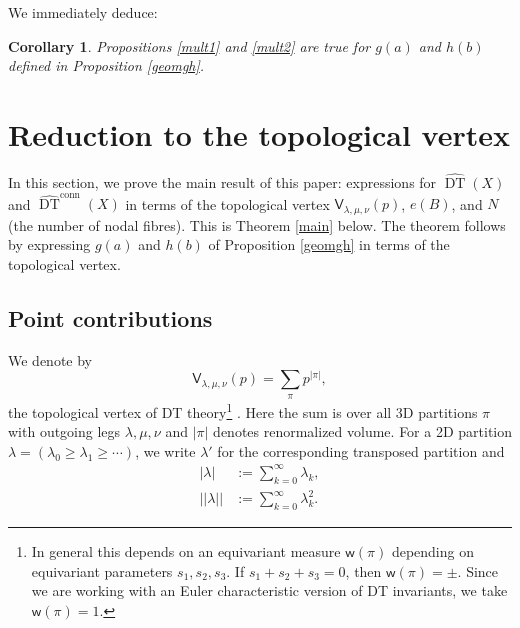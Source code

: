 \documentclass{amsart}
\newtheorem{corollary}[theorem]{Corollary}
\theoremstyle{definition}
\newcommand{\sfV}{\mathsf{V}}
\newcommand{\DT}{\operatorname{DT}}
\newcommand{\conn}{\operatorname{conn}}
\begin{document}
We immediately deduce:  
\begin{corollary} 
Propositions \ref{mult1} and \ref{mult2} are true for $g(a)$ and $h(b)$ defined in Proposition \ref{geomgh}.
\end{corollary}   
   
   
\section{Reduction to the topological vertex}  \label{vertex} 

In this section, we prove the main result of this paper: expressions for $\widehat{\DT}(X)$ and $\widehat{\DT}^{\conn}(X)$ in terms of the topological vertex $\sfV_{\lambda,\mu,\nu}(p)$, $e(B)$, and $N$ (the number of nodal fibres). This is Theorem \ref{main} below. The theorem follows by expressing $g(a)$ and $h(b)$ of Proposition \ref{geomgh} in terms of the topological vertex. 


\subsection{Point contributions}   

We denote by 
$$
\sfV_{\lambda,\mu,\nu}(p) = \sum_{\pi} p^{|\pi|}, 
$$
the topological vertex of DT theory\footnote{In general this depends on an equivariant measure $\mathsf{w}(\pi)$ depending on equivariant parameters $s_1, s_2, s_3$. If $s_1+s_2+s_3=0$, then $\mathsf{w}(\pi) = \pm$. Since we are working with an Euler characteristic version of DT invariants, we take $\mathsf{w}(\pi) = 1$.} \cite{MNOP1, MNOP2}. Here the sum is over all 3D partitions $\pi$ with outgoing legs $\lambda, \mu, \nu$ and $|\pi|$ denotes renormalized volume. For a 2D partition $\lambda = (\lambda_0 \geq \lambda_1 \geq \cdots)$, we write $\lambda'$ for the corresponding transposed partition and 
\begin{align*}
|\lambda| &:= \sum_{k=0}^{\infty} \lambda_k, \\
|\!|\lambda|\!| &:= \sum_{k=0}^{\infty} \lambda_{k}^{2}.
\end{align*}
\end{document}
